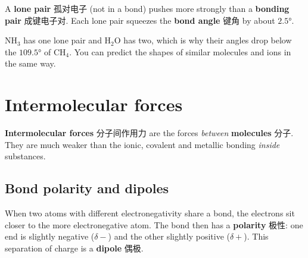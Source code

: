 \documentclass[11pt]{article}
\begin{document}
A \textbf{lone pair} 孤对电子 (not in a bond) pushes more strongly than a \textbf{bonding pair} 成键电子对. Each lone pair squeezes the \textbf{bond angle} 键角 by about $2.5°$.

\begin{center}
\end{center}

$\text{NH}_3$ has one lone pair and $\text{H}_2\text{O}$ has two, which is why their angles drop below the $109.5°$ of $\text{CH}_4$. You can predict the shapes of similar molecules and ions in the same way.

\section*{Intermolecular forces}

\textbf{Intermolecular forces} 分子间作用力 are the forces \emph{between} \textbf{molecules} 分子. They are much weaker than the ionic, covalent and metallic bonding \emph{inside} substances.

\subsection*{Bond polarity and dipoles}

When two atoms with different electronegativity share a bond, the electrons sit closer to the more electronegative atom. The bond then has a \textbf{polarity} 极性: one end is slightly negative ($\delta-$) and the other slightly positive ($\delta+$). This separation of charge is a \textbf{dipole} 偶极.
\end{document}
